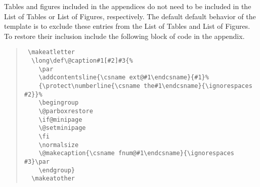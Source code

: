 \documentclass{wmu-thesis}
\begin{document}
 Tables and figures included in the appendices do not need to be included in the List of Tables or List of Figures, respectively.  The default default behavior of the template is to exclude these entries from the List of Tables and List of Figures.  To restore their inclusion %
 include the following block of code in the appendix.
\begin{quote}
\begin{verbatim}
 \makeatletter
  \long\def\@caption#1[#2]#3{%
    \par
    \addcontentsline{\csname ext@#1\endcsname}{#1}%
    {\protect\numberline{\csname the#1\endcsname}{\ignorespaces #2}}%
    \begingroup
    \@parboxrestore
    \if@minipage
    \@setminipage
    \fi
    \normalsize
    \@makecaption{\csname fnum@#1\endcsname}{\ignorespaces #3}\par
    \endgroup}
  \makeatother
\end{verbatim}
\end{quote}
 
 
\end{document}

